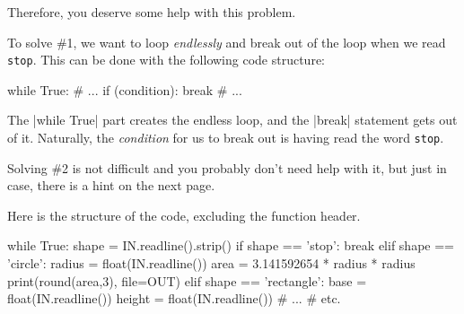 Therefore, you deserve some help with this problem.

To solve \#1, we want to loop \emph{endlessly} and break out of the loop when we read
\texttt{stop}. This can be done with the following code structure:
\begin{pythoncode}
  while True:
    # ...
    if (condition):
      break
    # ...
\end{pythoncode}

The \pycode|while True| part creates the endless loop, and the \pycode|break| statement
gets out of it. Naturally, the \emph{condition} for us to break out is having read the
word \texttt{stop}.

Solving \#2 is not difficult and you probably don't need help with it, but just in case,
there is a hint on the next page.

\clearpage

\Hint

Here is the structure of the code, excluding the function header.

\begin{pythoncode}
  while True:
    shape = IN.readline().strip()
    if shape == 'stop':
      break
    elif shape == 'circle':
      radius = float(IN.readline())
      area   = 3.141592654 * radius * radius
      print(round(area,3), file=OUT)
    elif shape == 'rectangle':
      base   = float(IN.readline())
      height = float(IN.readline())
      # ...
    # etc.
\end{pythoncode}

